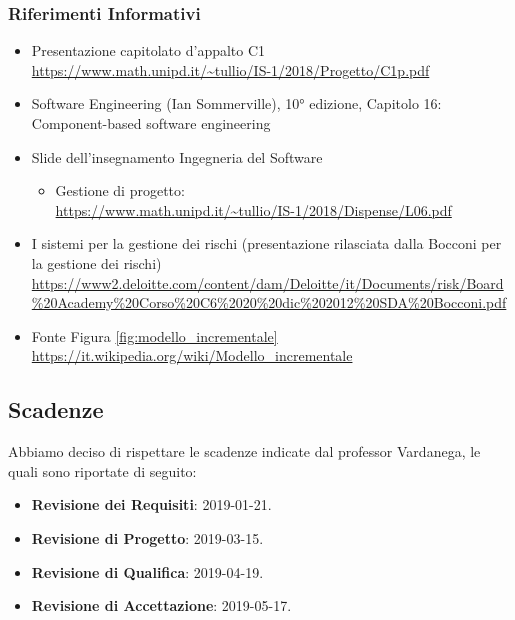 		\subsubsection{Riferimenti Informativi}\label{rifinfo}
			\begin{itemize}
				\item Presentazione capitolato d'appalto C1\\
				\url{https://www.math.unipd.it/~tullio/IS-1/2018/Progetto/C1p.pdf}
				\item Software Engineering (Ian Sommerville), 10° edizione, Capitolo 16: Component-based software engineering
				\item Slide dell’insegnamento Ingegneria del Software
				\begin{itemize}
					\item Gestione di progetto:\\
					\url{https://www.math.unipd.it/~tullio/IS-1/2018/Dispense/L06.pdf} 
				\end{itemize}
				\item I sistemi per la gestione dei rischi (presentazione rilasciata dalla Bocconi per la gestione dei rischi)\\
				\url{https://www2.deloitte.com/content/dam/Deloitte/it/Documents/risk/Board\%20Academy\%20Corso\%20C6\%2020\%20dic\%202012\%20SDA\%20Bocconi.pdf}
				\item Fonte Figura \ref{fig:modello_incrementale}\\
				\url{https://it.wikipedia.org/wiki/Modello_incrementale}
			\end{itemize}
		
	\subsection{Scadenze}\label{Scadenze}
	Abbiamo deciso di rispettare le scadenze indicate dal professor Vardanega, le quali sono riportate di seguito:
	\begin{itemize}
		\item \textbf{Revisione dei Requisiti}: 2019-01-21.
		\item \textbf{Revisione di Progetto}: 2019-03-15.
		\item \textbf{Revisione di Qualifica}: 2019-04-19.
		\item \textbf{Revisione di Accettazione}: 2019-05-17.
	\end{itemize}
	
